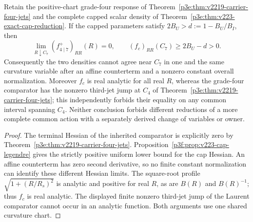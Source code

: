 \documentclass[12pt,a4paper]{article}
\begin{document}
\begin{proposition}
\label{p3e:prop:v288-cap-laurent-nonidentification}
Retain the positive-chart grade-four response of
Theorem~\ref{p3e:thm:v2219-carrier-four-jets} and the complete capped
scalar density of Theorem~\ref{p3e:thm:v223-exact-cap-reduction}.
If the capped parameters satisfy $2B_U>d:=1-B_U/B_I$, then
\[
 \lim_{R\downarrow C_7}(f_{4\mid7}^{+})_{RR}(R)=0,
 \qquad (f_c)_{RR}(C_7)\ge 2B_U-d>0.
\]
Consequently the two densities cannot agree near $C_7$ in one and the
same curvature variable after an affine counterterm and a nonzero
constant overall normalization. Moreover $f_c$ is real analytic for
all real $R$, whereas the grade-four comparator has the nonzero
third-jet jump at $C_4$ of
Theorem~\ref{p3e:thm:v2219-carrier-four-jets}; this independently
forbids their equality on any common interval spanning $C_4$.
Neither conclusion forbids different reductions of a more complete
common action with a separately derived change of variables or owner.
\end{proposition}
\begin{proof}
The terminal Hessian of the inherited comparator is explicitly zero by
Theorem~\ref{p3e:thm:v2219-carrier-four-jets}.
Proposition~\ref{p3f:prop:v223-cap-legendre} gives the strictly positive
uniform lower bound for the cap Hessian. An affine counterterm has
zero second derivative, so no finite constant normalization can
identify these different Hessian limits. The square-root profile
$\sqrt{1+(R/R_s)^2}$ is analytic and positive for real $R$, as are
$B(R)$ and $B(R)^{-1}$; thus $f_c$ is real analytic. The displayed
finite nonzero third-jet jump of the Laurent comparator cannot occur
in an analytic function. Both arguments use one shared curvature chart.
\end{proof}
\end{document}

